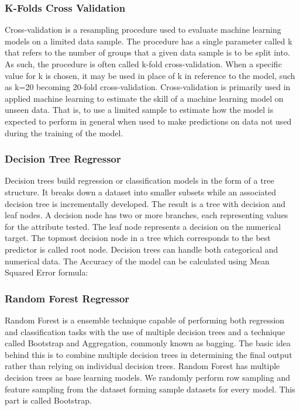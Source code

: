 \documentclass[conference]{IEEEtran}
\begin{document}
\subsubsection{K-Folds Cross Validation}
Cross-validation is a resampling procedure used to evaluate machine learning models on a limited data sample.
The procedure has a single parameter called k that refers to the number of groups that a given data sample is to be split into. As such, the procedure is often called k-fold cross-validation.
When a specific value for k is chosen, it may be used in place of k in reference to the model, such as k=20 becoming 20-fold cross-validation.
Cross-validation is primarily used in applied machine learning to estimate the skill of a machine learning model on unseen data.
That is, to use a limited sample to estimate how the model is expected to perform in general when used to make predictions on data not used during the training of the model.

\subsubsection{Decision Tree Regressor}
Decision trees build regression or classification models in the form of a tree structure.
It breaks down a dataset into smaller subsets while an associated decision tree is incrementally developed.
The result is a tree with decision and leaf nodes.
A decision node has two or more branches, each representing values for the attribute tested.
The leaf node represents a decision on the numerical target.
The topmost decision node in a tree which corresponds to the best predictor is called root node.
Decision trees can handle both categorical and numerical data.
The Accuracy of the model can be calculated using Mean Squared Error formula:

\subsubsection{Random Forest Regressor}
Random Forest is a ensemble technique capable of performing both regression and classification tasks with the use of multiple decision trees and a technique called Bootstrap and Aggregation, commonly known as bagging.
The basic idea behind this is to combine multiple decision trees in determining the final output rather than relying on individual decision trees.
Random Forest has multiple decision trees as base learning models.
We randomly perform row sampling and feature sampling from the dataset forming sample datasets for every model.
This part is called Bootstrap.
\end{document}
